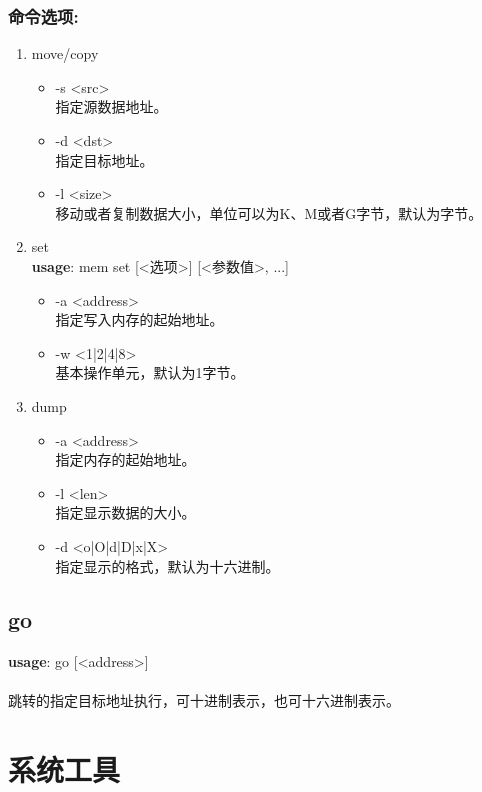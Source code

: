 \subsubsection{命令选项:}
\begin{enumerate}
	\item move/copy
	\begin{itemize}
		\item -s <src> \\
		指定源数据地址。
		\item -d <dst> \\
		指定目标地址。
		\item -l <size> \\
		移动或者复制数据大小，单位可以为K、M或者G字节，默认为字节。
	\end{itemize}

	\item set \\
	\textbf{usage}: mem set [<选项>] [<参数值>, ...]
	\begin{itemize}
		\item -a <address> \\
		指定写入内存的起始地址。
		\item -w <1|2|4|8> \\
		基本操作单元，默认为1字节。
	\end{itemize}

	\item dump
	\begin{itemize}
		\item -a <address> \\
		指定内存的起始地址。
		\item -l <len> \\
		指定显示数据的大小。
		\item -d <o|O|d|D|x|X> \\
		指定显示的格式，默认为十六进制。
	\end{itemize}
\end{enumerate}

\subsection{go}
\textbf{usage}: go [<address>] \\
\\ 跳转的指定目标地址执行，可十进制表示，也可十六进制表示。

\section{系统工具}

